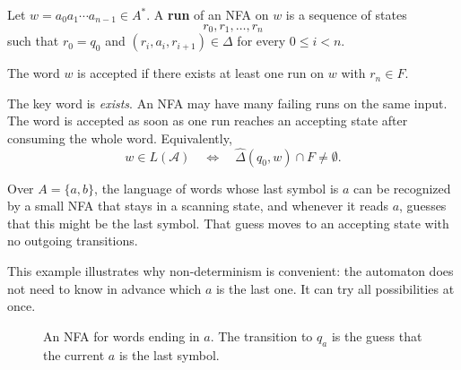 
\begin{definition}
\label{def:nfa-run}
Let $w=a_0a_1\cdots a_{n-1}\in A^*$.  A \textbf{run} of an NFA on $w$
is a sequence of states
\[
  r_0,r_1,\ldots,r_n
\]
such that $r_0=q_0$ and $(r_i,a_i,r_{i+1})\in\Delta$ for every
$0\leq i<n$.

The word $w$ is accepted if there exists at least one run on $w$ with
$r_n\in F$.
\end{definition}

The key word is \emph{exists}.  An NFA may have many failing runs on the
same input.  The word is accepted as soon as one run reaches an accepting
state after consuming the whole word.
Equivalently,
\[
  w\in L(\mathcal{A})
  \quad\Longleftrightarrow\quad
  \widehat{\Delta}(q_0,w)\cap F\neq\emptyset.
\]

\begin{example}
\label{ex:nfa-last-a}
Over $A=\{a,b\}$, the language of words whose last symbol is $a$
can be recognized by a small NFA that stays in a scanning state, and
whenever it reads $a$, guesses that this might be the last symbol.
That guess moves to an accepting state with no outgoing transitions.
\end{example}

This example illustrates why non-determinism is convenient: the automaton
does not need to know in advance which $a$ is the last one.  It can try
all possibilities at once.

\begin{figure}[ht]
\centering
{}
\caption{An NFA for words ending in $a$.  The transition to $q_a$ is the guess that the current $a$ is the last symbol.}
\label{fig:nfa-last-a}
\end{figure}

